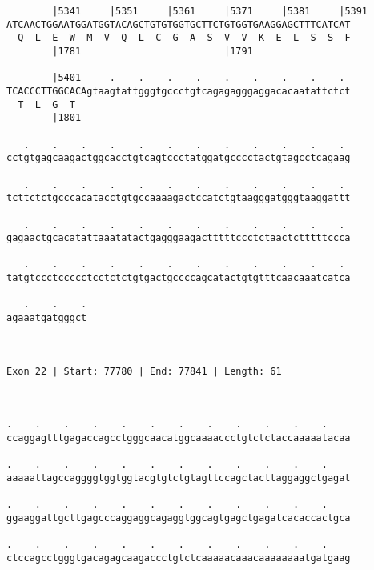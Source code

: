 \documentclass{article}
\begin{document}
\begin{Verbatim}
        |5341     |5351     |5361     |5371     |5381     |5391
ATCAACTGGAATGGATGGTACAGCTGTGTGGTGCTTCTGTGGTGAAGGAGCTTTCATCAT
  Q  L  E  W  M  V  Q  L  C  G  A  S  V  V  K  E  L  S  S  F
        |1781                         |1791                 
  
        |5401     .    .    .    .    .    .    .    .    . 
TCACCCTTGGCACAgtaagtattgggtgccctgtcagagagggaggacacaatattctct
  T  L  G  T                                                
        |1801                                               
  
   .    .    .    .    .    .    .    .    .    .    .    . 
cctgtgagcaagactggcacctgtcagtccctatggatgcccctactgtagcctcagaag
                                                            
   .    .    .    .    .    .    .    .    .    .    .    . 
tcttctctgcccacatacctgtgccaaaagactccatctgtaagggatgggtaaggattt
                                                            
   .    .    .    .    .    .    .    .    .    .    .    . 
gagaactgcacatattaaatatactgagggaagactttttccctctaactctttttccca
                                                            
   .    .    .    .    .    .    .    .    .    .    .    . 
tatgtccctccccctcctctctgtgactgccccagcatactgtgtttcaacaaatcatca
                                                            
   .    .    .
agaaatgatgggct
              
              
 
Exon 22 | Start: 77780 | End: 77841 | Length: 61



.    .    .    .    .    .    .    .    .    .    .    .    
ccaggagtttgagaccagcctgggcaacatggcaaaaccctgtctctaccaaaaatacaa
                                                            
.    .    .    .    .    .    .    .    .    .    .    .    
aaaaattagccaggggtggtggtacgtgtctgtagttccagctacttaggaggctgagat
                                                            
.    .    .    .    .    .    .    .    .    .    .    .    
ggaaggattgcttgagcccaggaggcagaggtggcagtgagctgagatcacaccactgca
                                                            
.    .    .    .    .    .    .    .    .    .    .    .    
ctccagcctgggtgacagagcaagaccctgtctcaaaaacaaacaaaaaaaatgatgaag
                                                            

\end{Verbatim}
\end{document}
